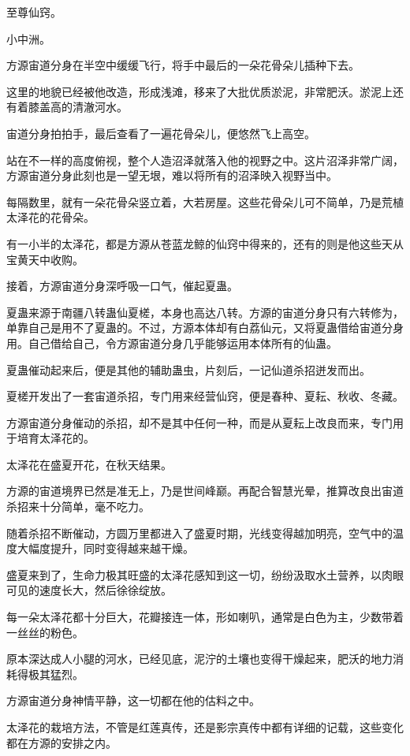 
\begin{this_body}

至尊仙窍。

小中洲。

方源宙道分身在半空中缓缓飞行，将手中最后的一朵花骨朵儿插种下去。

这里的地貌已经被他改造，形成浅滩，移来了大批优质淤泥，非常肥沃。淤泥上还有着膝盖高的清澈河水。

宙道分身拍拍手，最后查看了一遍花骨朵儿，便悠然飞上高空。

站在不一样的高度俯视，整个人造沼泽就落入他的视野之中。这片沼泽非常广阔，方源宙道分身此刻也是一望无垠，难以将所有的沼泽映入视野当中。

每隔数里，就有一朵花骨朵竖立着，大若房屋。这些花骨朵儿可不简单，乃是荒植太泽花的花骨朵。

有一小半的太泽花，都是方源从苍蓝龙鲸的仙窍中得来的，还有的则是他这些天从宝黄天中收购。

接着，方源宙道分身深呼吸一口气，催起夏蛊。

夏蛊来源于南疆八转蛊仙夏槎，本身也高达八转。方源的宙道分身只有六转修为，单靠自己是用不了夏蛊的。不过，方源本体却有白荔仙元，又将夏蛊借给宙道分身用。自己借给自己，令方源宙道分身几乎能够运用本体所有的仙蛊。

夏蛊催动起来后，便是其他的辅助蛊虫，片刻后，一记仙道杀招迸发而出。

夏槎开发出了一套宙道杀招，专门用来经营仙窍，便是春种、夏耘、秋收、冬藏。

方源宙道分身催动的杀招，却不是其中任何一种，而是从夏耘上改良而来，专门用于培育太泽花的。

太泽花在盛夏开花，在秋天结果。

方源的宙道境界已然是准无上，乃是世间峰巅。再配合智慧光晕，推算改良出宙道杀招来十分简单，毫不吃力。

随着杀招不断催动，方圆万里都进入了盛夏时期，光线变得越加明亮，空气中的温度大幅度提升，同时变得越来越干燥。

盛夏来到了，生命力极其旺盛的太泽花感知到这一切，纷纷汲取水土营养，以肉眼可见的速度长大，然后徐徐绽放。

每一朵太泽花都十分巨大，花瓣接连一体，形如喇叭，通常是白色为主，少数带着一丝丝的粉色。

原本深达成人小腿的河水，已经见底，泥泞的土壤也变得干燥起来，肥沃的地力消耗得极其猛烈。

方源宙道分身神情平静，这一切都在他的估料之中。

太泽花的栽培方法，不管是红莲真传，还是影宗真传中都有详细的记载，这些变化都在方源的安排之内。


\end{this_body}
